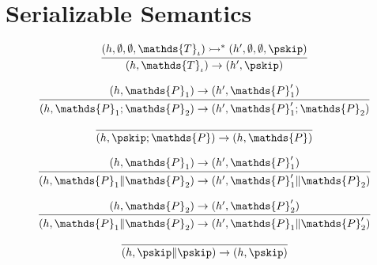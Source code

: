 \section{Serializable Semantics}

\[
\infer
{
	(h, \mathds{T}_\iota) \rightarrow (h', \pskip)
}
{
	(h, \emptyset, \emptyset, \mathds{T}_\iota) \rightarrowtail^* (h', \emptyset, \emptyset, \pskip)
}
\]

\[
\infer
{
	(h, \mathds{P}_1 ; \mathds{P}_2) \rightarrow (h', \mathds{P}_1' ; \mathds{P}_2)
}
{
	(h, \mathds{P}_1) \rightarrow (h', \mathds{P}_1')
}
\]

\[
\infer
{
	(h, \pskip ; \mathds{P}) \rightarrow (h, \mathds{P})
}
{}
\]

\[
\infer
{
	(h, \mathds{P}_1 \| \mathds{P}_2) \rightarrow (h', \mathds{P}_1' \| \mathds{P}_2)
}
{
	(h, \mathds{P}_1) \rightarrow (h', \mathds{P}_1')
}
\]

\[
\infer
{
	(h, \mathds{P}_1 \| \mathds{P}_2) \rightarrow (h', \mathds{P}_1 \| \mathds{P}_2')
}
{
	(h, \mathds{P}_2) \rightarrow (h', \mathds{P}_2')
}
\]

\[
\infer
{
	(h, \pskip \| \pskip) \rightarrow (h, \pskip)
}
{}
\]

